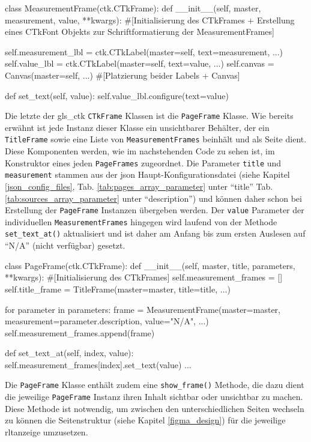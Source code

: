 \begin{pythoncode}
class MeasurementFrame(ctk.CTkFrame):
	def __init__(self, master, measurement, value, **kwargs):
		#[Initialisierung des CTkFrames + Erstellung eines CTkFont Objekts zur Schriftformatierung der MeasurementFrames]
		
		self.measurement_lbl = ctk.CTkLabel(master=self, text=measurement, ...)
		self.value_lbl = ctk.CTkLabel(master=self, text=value, ...)
		self.canvas = Canvas(master=self, ...)
		#[Platzierung beider Labels + Canvas]
		
	def set_text(self, value):
		self.value_lbl.configure(text=value)
\end{pythoncode}

Die letzte der \gls{gls_ctk} \lstinline{CTkFrame} Klassen ist die \lstinline{PageFrame} Klasse. Wie bereits erwähnt ist jede Instanz dieser Klasse ein unsichtbarer Behälter, der ein \lstinline{TitleFrame} sowie eine Liste von \lstinline{MeasurementFrames} beinhält und als Seite dient. Diese Komponenten werden, wie im nachstehenden Code zu sehen ist, im Konstruktor eines jeden \lstinline{PageFrames} zugeordnet. Die Parameter \lstinline{title} und \lstinline{measurement} stammen aus der \acs{json} Haupt-Konfigurationsdatei (siehe Kapitel \ref{json_config_files}, Tab. \ref{tab:pages_array_parameter} unter \enquote{title} \bzw Tab. \ref{tab:sources_array_parameter}  unter \enquote{description}) und können daher schon bei Erstellung der \lstinline{PageFrame} Instanzen übergeben werden. Der \lstinline{value} Parameter der individuellen \lstinline{MeasurementFrames} hingegen wird laufend von der Methode \lstinline{set_text_at()} aktualisiert und ist daher am Anfang bis zum ersten Auslesen auf \enquote{N/A} (\dt nicht verfügbar) gesetzt.
	
\begin{pythoncode}
class PageFrame(ctk.CTkFrame):
	def __init__(self, master, title, parameters, **kwargs):
		#[Initialisierung des CTkFrames]
		self.measurement_frames = []
		self.title_frame = TitleFrame(master=master, title=title, ...)
		
		for parameter in parameters:
			frame = MeasurementFrame(master=master, measurement=parameter.description, value="N/A", ...)
			self.measurement_frames.append(frame)

    def set_text_at(self, index, value):
        self.measurement_frames[index].set_text(value)
...
\end{pythoncode}

Die \lstinline{PageFrame} Klasse enthält zudem eine \lstinline{show_frame()} Methode, die dazu dient die jeweilige \lstinline{PageFrame} Instanz \bzw ihren Inhalt sichtbar oder unsichtbar zu machen. Diese Methode ist notwendig, um zwischen den unterschiedlichen Seiten wechseln zu können \bzw die Seitenstruktur (siehe Kapitel \ref{figma_design}) für die jeweilige \acs{rltanzeige} umzusetzen.

